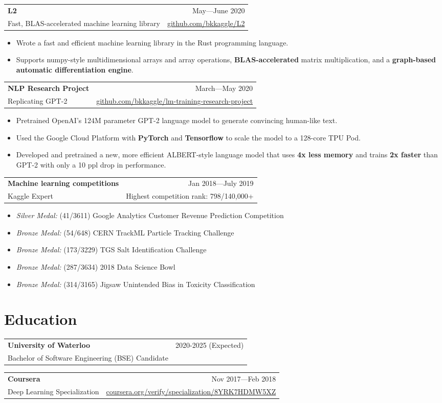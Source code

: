 \documentclass[letterpaper,11pt]{article}
\makeatletter
\newcommand{\items}[1]{
    \begin{itemize}[topsep=0pt]\itemsep0em
        #1
    \end{itemize}    
}
\newcommand{\heading}[4]{
    \begin{tabular*}{\textwidth}{l@{\extracolsep{\fill}}r}
        \large\textbf{#1} & #2\\
        #3 & #4
    \end{tabular*}
}
\makeatother
\begin{document}
    \heading{L2}{May—June 2020}{Fast, BLAS-accelerated machine learning library}{\href{https://github.com/bkkaggle/L2}{github.com/bkkaggle/L2}}
    \items{
        \item Wrote a fast and efficient machine learning library in the Rust programming language.
        \item Supports numpy-style multidimensional arrays and array operations, \textbf{BLAS-accelerated} matrix multiplication, and a \textbf{graph-based automatic differentiation engine}.
    }
    \vspace{5pt}

    \heading{NLP Research Project}{March—May 2020}{Replicating GPT-2}{\href{https://github.com/bkkaggle/lm-training-research-project}{github.com/bkkaggle/lm-training-research-project}}
    \items{
        \item Pretrained OpenAI's 124M parameter GPT-2 language model to generate convincing human-like text.
        \item Used the Google Cloud Platform with \textbf{PyTorch} and \textbf   {Tensorflow} to scale the model to a 128-core TPU Pod. 
        \item Developed and pretrained a new, more efficient ALBERT-style language model that uses \textbf{4x less memory} and trains \textbf{2x faster} than GPT-2 with only a 10 ppl drop in performance.
    }
    \vspace{5pt}
    
    \heading{Machine learning competitions}{Jan 2018—July 2019}{Kaggle Expert}{Highest competition rank: 798/140,000+}
    \items{
        \item \textit{Silver Medal:} (41/3611) Google Analytics Customer Revenue Prediction Competition
        \item \textit{Bronze Medal:} (54/648) CERN TrackML Particle Tracking Challenge
        \item \textit{Bronze Medal:} (173/3229) TGS Salt Identification Challenge
        \item \textit{Bronze Medal:} (287/3634) 2018 Data Science Bowl
        \item \textit{Bronze Medal:} (314/3165) Jigsaw Unintended Bias in Toxicity Classification
    }

\section{Education}
    \heading{University of Waterloo}{2020-2025 (Expected)}{Bachelor of Software Engineering (BSE) Candidate}{}
    \heading{Coursera}{Nov 2017—Feb 2018}{Deep Learning Specialization}{\href{https://coursera.org/verify/specialization/8YRK7HDMW5XZ}{coursera.org/verify/specialization/8YRK7HDMW5XZ}}
\end{document}
